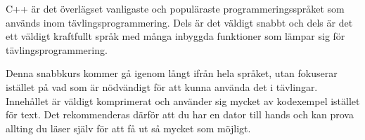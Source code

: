 C++ är det överlägset vanligaste och populäraste programmeringsspråket som används inom tävlingsprogrammering. Dels är det väldigt snabbt och dels är det ett väldigt kraftfullt språk med många inbyggda funktioner som lämpar sig för tävlingsprogrammering.

Denna snabbkurs kommer gå igenom långt ifrån hela språket, utan fokuserar istället på vad som är nödvändigt för att kunna använda det i tävlingar. Innehållet är väldigt komprimerat och använder sig mycket av kodexempel istället för text. Det rekommenderas därför att du har en dator till hands och kan prova allting du läser själv för att få ut så mycket som möjligt.